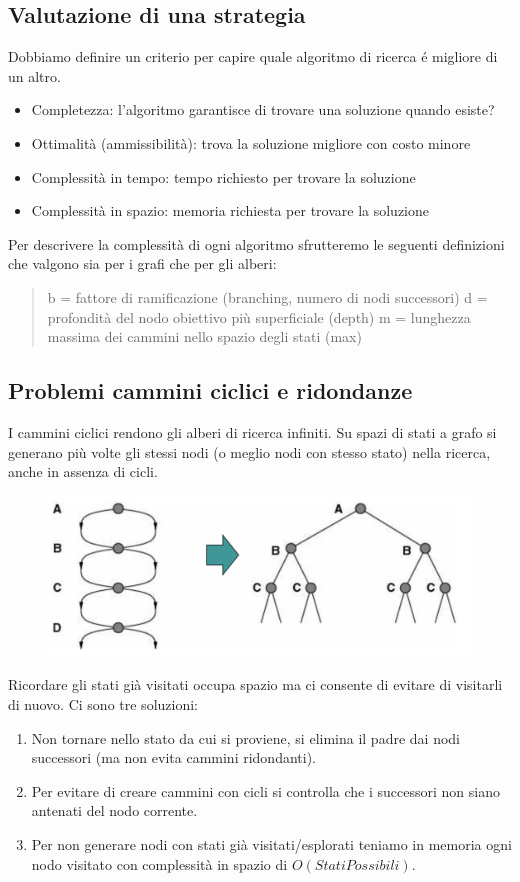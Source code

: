 \documentclass{article}
\begin{document}
\subsection{Valutazione di una strategia}
Dobbiamo definire un criterio per capire quale algoritmo di ricerca é migliore di un altro.
\begin{itemize}
    \item Completezza: l'algoritmo garantisce di trovare una soluzione quando esiste?
    \item Ottimalità (ammissibilità): trova la soluzione migliore con costo minore
    \item Complessità in tempo: tempo richiesto per trovare la soluzione
    \item Complessità in spazio: memoria richiesta per trovare la soluzione
\end{itemize}
Per descrivere la complessità di ogni algoritmo sfrutteremo le seguenti definizioni che valgono sia per i grafi che per gli alberi:
\begin{quote}
    b = fattore di ramificazione (branching, numero di nodi successori) \newline
    d = profondità del nodo obiettivo più superficiale (depth) \newline
    m = lunghezza massima dei cammini nello spazio degli stati (max)
\end{quote}

\subsection{Problemi cammini ciclici e ridondanze}
I cammini ciclici rendono gli alberi di ricerca infiniti. Su spazi di stati a grafo si generano più volte gli stessi nodi (o meglio nodi con stesso stato) nella ricerca, anche in assenza di cicli.
\begin{figure}[H]
    \centering
    \includegraphics[scale=0.4]{Images/RidondanzeGrafi.png}
\end{figure}
Ricordare gli stati già visitati occupa spazio ma ci consente di evitare di visitarli di nuovo. Ci sono tre soluzioni:
\begin{enumerate}
    \item Non tornare nello stato da cui si proviene, si elimina il padre dai nodi successori (ma non evita cammini ridondanti).
    \item Per evitare di creare cammini con cicli si controlla che i successori non siano antenati del nodo corrente.
    \item Per non generare nodi con stati già visitati/esplorati teniamo in memoria ogni nodo visitato con complessità in spazio di $O(StatiPossibili)$.
\end{enumerate}
\end{document}
